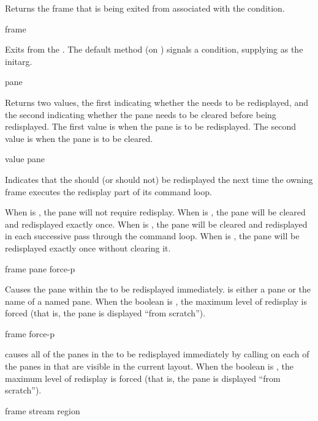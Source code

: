 Returns the frame that is being exited from associated with the 
condition.

 {frame}

Exits from the  .  The default method (on
) signals a  condition, supplying
 as the  initarg.


 {pane}

Returns two values, the first indicating whether the  
needs to be redisplayed, and the second indicating whether the pane needs to be
cleared before being redisplayed.  The first value is  when the pane
is to be redisplayed.  The second value is  when the pane is to be
cleared.

 {value pane}

Indicates that the   should (or should not) be redisplayed
the next time the owning frame executes the redisplay part of its command loop.

When  is , the pane will not require redisplay.  When
 is , the pane will be cleared and redisplayed exactly once.
When  is , the pane will be cleared and redisplayed
in each successive pass through the command loop.  When  is
, the pane will be redisplayed exactly once without clearing it.

 {frame pane \key force-p}

Causes the pane  within the   to be redisplayed
immediately.   is either a pane or the name of a named pane.  When the
boolean  is , the maximum level of redisplay is forced
(that is, the pane is displayed ``from scratch'').

 {frame \key force-p}

 causes all of the panes in the 
 to be redisplayed immediately by calling 
on each of the panes in  that are visible in the current layout.
When the boolean  is , the maximum level of redisplay is
forced (that is, the pane is displayed ``from scratch'').

 {frame stream \optional region}

